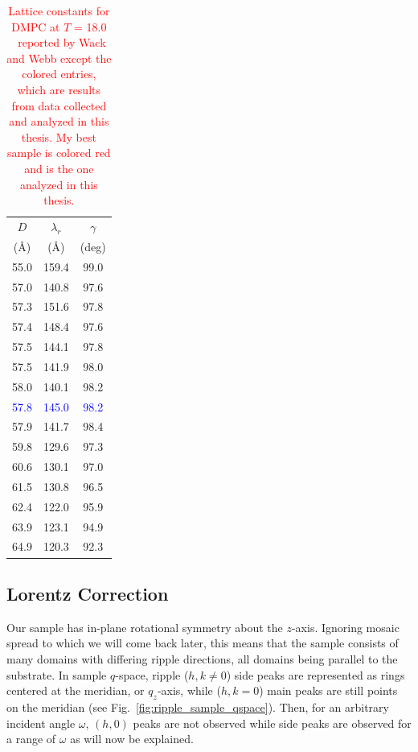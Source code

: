 \begin{table}[htbp]
\centering
  \begin{tabular}{ccc}
    \hline
    $D$ & $\lambda_r$ & $\gamma$ \\
    (\AA) & (\AA) & (deg) \\
    \hline
    55.0 & 159.4 & 99.0 \\
    57.0 & 140.8 & 97.6 \\
    57.3 & 151.6 & 97.8 \\
    57.4 & 148.4 & 97.6 \\
    57.5	 & 144.1 & 97.8 \\
    57.5 & 141.9 & 98.0 \\
    58.0 & 140.1 & 98.2 \\
    \textcolor{blue}{57.8} & \textcolor{blue}{145.0} & \textcolor{blue}{98.2} \\
    57.9 & 141.7 & 98.4 \\
    59.8 & 129.6 & 97.3 \\
    60.6 & 130.1 & 97.0 \\
    61.5 & 130.8 & 96.5 \\
    62.4 & 122.0 & 95.9 \\
    63.9 & 123.1 & 94.9 \\
    64.9 & 120.3 & 92.3 \\    
    \hline 
  \end{tabular}
  \caption{
  \textcolor{red}{Lattice constants for DMPC at $T$ = 18.0 \textcelsius\
  reported by Wack and Webb \cite{ref:Wack89} except the colored entries, 
  which are results from data collected and analyzed in this thesis.
  My best sample is colored red and is the one analyzed in this thesis.}} 
  \label{tab:wack_lattice}
\end{table}

\subsection{Lorentz Correction}\label{sec:Lorentz_correction}
Our sample has in-plane rotational symmetry about the $z$-axis. 
Ignoring mosaic spread to which we will come back later, this means that the sample 
consists of many domains with differing ripple directions, all domains
being parallel to the substrate.  
In sample $q$-space, ripple ($h, k\neq 0$) side peaks are represented as rings 
centered at the meridian, or $q_z$-axis, 
while ($h, k=0$) main peaks are still points on the meridian 
(see Fig.~\ref{fig:ripple_sample_qspace}). 
Then, for an arbitrary incident angle $\omega$, $(h, 0)$ peaks are not observed
while side peaks are observed for a range of $\omega$ as will now be explained. 

